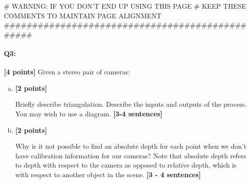 \begin{enumerate}[(a)]
\begin{tcolorbox}[enhanced jigsaw,breakable,pad at break*=1mm,colback=white!5!white,colframe=green!75!black,height fixed for=all]
\begin{python}
    # WARNING: IF YOU DON'T END UP USING THIS PAGE
    # KEEP THESE COMMENTS TO MAINTAIN PAGE ALIGNMENT
    ################################################
    \end{python}
\end{tcolorbox}






\pagebreak
\paragraph{Q3:} \textbf{[4 points]} Given a stereo pair of cameras:
\begin{enumerate} [(a)]
\item \textbf{[2 points]} 
\begin{tcolorbox}[colback=orange!5!white,colframe=orange!75!black]
Briefly describe triangulation. Describe the inputs and outputs of the process. You may wish to use a diagram. \textbf{[3-4 sentences]}
\end{tcolorbox}


\item \textbf{[2 points]} 
\begin{tcolorbox}[colback=orange!5!white,colframe=orange!75!black]
Why is it not possible to find an absolute depth for each point when we don't have calibration information for our cameras? Note that absolute depth refers to depth with respect to the camera as opposed to relative depth, which is with respect to another object in the scene. \textbf{[3 - 4 sentences]}
\end{tcolorbox}
\end{enumerate}
\end{enumerate}
